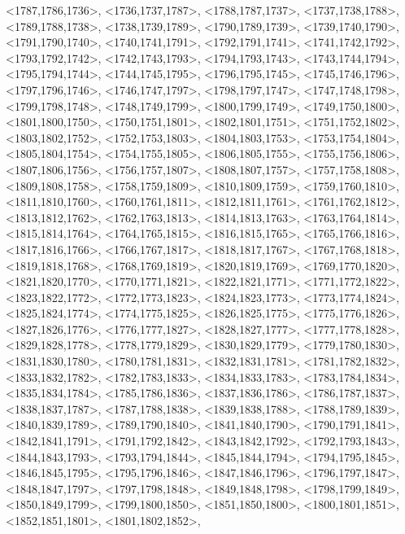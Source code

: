 \documentclass[a4paper,10pt]{article}
\begin{document}
\begin{eulernotebook}
\begin{euleroutput}
  <1787,1786,1736>,
  <1736,1737,1787>,
  <1788,1787,1737>,
  <1737,1738,1788>,
  <1789,1788,1738>,
  <1738,1739,1789>,
  <1790,1789,1739>,
  <1739,1740,1790>,
  <1791,1790,1740>,
  <1740,1741,1791>,
  <1792,1791,1741>,
  <1741,1742,1792>,
  <1793,1792,1742>,
  <1742,1743,1793>,
  <1794,1793,1743>,
  <1743,1744,1794>,
  <1795,1794,1744>,
  <1744,1745,1795>,
  <1796,1795,1745>,
  <1745,1746,1796>,
  <1797,1796,1746>,
  <1746,1747,1797>,
  <1798,1797,1747>,
  <1747,1748,1798>,
  <1799,1798,1748>,
  <1748,1749,1799>,
  <1800,1799,1749>,
  <1749,1750,1800>,
  <1801,1800,1750>,
  <1750,1751,1801>,
  <1802,1801,1751>,
  <1751,1752,1802>,
  <1803,1802,1752>,
  <1752,1753,1803>,
  <1804,1803,1753>,
  <1753,1754,1804>,
  <1805,1804,1754>,
  <1754,1755,1805>,
  <1806,1805,1755>,
  <1755,1756,1806>,
  <1807,1806,1756>,
  <1756,1757,1807>,
  <1808,1807,1757>,
  <1757,1758,1808>,
  <1809,1808,1758>,
  <1758,1759,1809>,
  <1810,1809,1759>,
  <1759,1760,1810>,
  <1811,1810,1760>,
  <1760,1761,1811>,
  <1812,1811,1761>,
  <1761,1762,1812>,
  <1813,1812,1762>,
  <1762,1763,1813>,
  <1814,1813,1763>,
  <1763,1764,1814>,
  <1815,1814,1764>,
  <1764,1765,1815>,
  <1816,1815,1765>,
  <1765,1766,1816>,
  <1817,1816,1766>,
  <1766,1767,1817>,
  <1818,1817,1767>,
  <1767,1768,1818>,
  <1819,1818,1768>,
  <1768,1769,1819>,
  <1820,1819,1769>,
  <1769,1770,1820>,
  <1821,1820,1770>,
  <1770,1771,1821>,
  <1822,1821,1771>,
  <1771,1772,1822>,
  <1823,1822,1772>,
  <1772,1773,1823>,
  <1824,1823,1773>,
  <1773,1774,1824>,
  <1825,1824,1774>,
  <1774,1775,1825>,
  <1826,1825,1775>,
  <1775,1776,1826>,
  <1827,1826,1776>,
  <1776,1777,1827>,
  <1828,1827,1777>,
  <1777,1778,1828>,
  <1829,1828,1778>,
  <1778,1779,1829>,
  <1830,1829,1779>,
  <1779,1780,1830>,
  <1831,1830,1780>,
  <1780,1781,1831>,
  <1832,1831,1781>,
  <1781,1782,1832>,
  <1833,1832,1782>,
  <1782,1783,1833>,
  <1834,1833,1783>,
  <1783,1784,1834>,
  <1835,1834,1784>,
  <1785,1786,1836>,
  <1837,1836,1786>,
  <1786,1787,1837>,
  <1838,1837,1787>,
  <1787,1788,1838>,
  <1839,1838,1788>,
  <1788,1789,1839>,
  <1840,1839,1789>,
  <1789,1790,1840>,
  <1841,1840,1790>,
  <1790,1791,1841>,
  <1842,1841,1791>,
  <1791,1792,1842>,
  <1843,1842,1792>,
  <1792,1793,1843>,
  <1844,1843,1793>,
  <1793,1794,1844>,
  <1845,1844,1794>,
  <1794,1795,1845>,
  <1846,1845,1795>,
  <1795,1796,1846>,
  <1847,1846,1796>,
  <1796,1797,1847>,
  <1848,1847,1797>,
  <1797,1798,1848>,
  <1849,1848,1798>,
  <1798,1799,1849>,
  <1850,1849,1799>,
  <1799,1800,1850>,
  <1851,1850,1800>,
  <1800,1801,1851>,
  <1852,1851,1801>,
  <1801,1802,1852>,

\end{euleroutput}
\end{eulernotebook}
\end{document}
